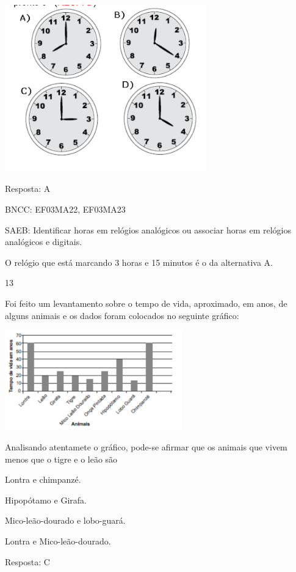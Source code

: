 \begin{escolha}
{\begin{escolha}
{\includegraphics[width=3.44197in,height=2.84191in]{media/image126.png}

Resposta: A

BNCC: EF03MA22, EF03MA23

SAEB: Identificar horas em relógios analógicos ou associar
horas em relógios analógicos e digitais.

O relógio que está marcando 3 horas e 15 minutos é o da alternativa A.

\num{13}

Foi feito um levantamento sobre o tempo de vida, aproximado, em anos, de alguns animais e os dados foram colocados no seguinte gráfico:

\includegraphics[width=3.02451in,height=1.70004in]{media/image127.png}

Analisando atentamete o gráfico, pode-se afirmar que os animais que vivem menos que o tigre e o leão são

\begin{escolha}

\item
  Lontra e chimpanzé.
\item
  Hipopótamo e Girafa.
\item
  Mico-leão-dourado e lobo-guará.
\item
  Lontra e Mico-leão-dourado.
\end{escolha}

Resposta: C

}
\end{escolha}}
\end{escolha}
